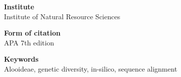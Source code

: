 \thispagestyle{empty}
\vspace*{\fill}


\vspace{0.5cm}

\noindent\textbf{Institute}\\
Institute of Natural Resource Sciences

\noindent\textbf{Form of citation}\\
APA 7th edition

\noindent\textbf{Keywords}\\
Alooideae, genetic diversity, in-silico, sequence alignment
